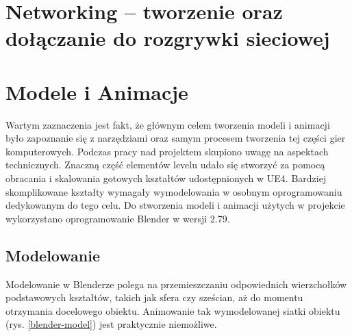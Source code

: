 \documentclass[multip]{SGGW-thesis}
\begin{document}
\section{Networking -- tworzenie oraz dołączanie do rozgrywki sieciowej}
	\label{networking}
\clearpage
\section{Modele i Animacje }
Wartym zaznaczenia jest fakt, że głównym celem tworzenia modeli i animacji było zapoznanie się z narzędziami oraz samym procesem tworzenia tej części gier komputerowych. Podczas pracy nad projektem skupiono uwagę na aspektach technicznych. Znaczną część elementów levelu udało się stworzyć za pomocą obracania i skalowania gotowych kształtów udostępnionych w UE4. Bardziej skomplikowane kształty wymagały wymodelowania w osobnym oprogramowaniu dedykowanym do tego celu. Do stworzenia modeli i animacji użytych w projekcie wykorzystano oprogramowanie Blender w wersji 2.79.

	\subsection{Modelowanie}
Modelowanie w Blenderze polega na przemieszczaniu odpowiednich wierzchołków podstawowych kształtów, takich jak sfera czy sześcian, aż do momentu otrzymania docelowego obiektu. Animowanie tak wymodelowanej siatki obiektu (rys. \ref{blender-model}) jest praktycznie niemożliwe.
\end{document}

